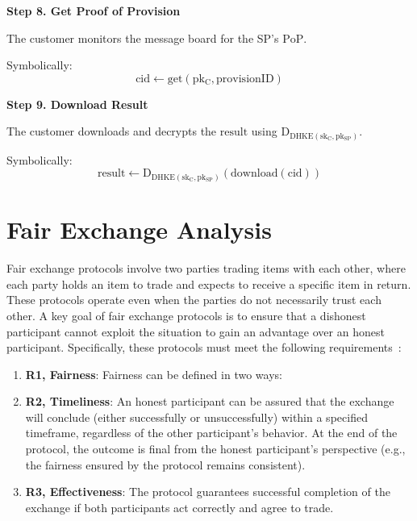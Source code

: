 \documentclass[pdftex,twocolumn,epjc3]{svjour3}
\begin{document}
\noindent \textbf{Step 8. Get Proof of Provision}\label{step-8-get-proof-of-provision}

The customer monitors the message board for the SP's $\mathrm{PoP}$.

Symbolically: 
\[
\mathrm{cid \gets get(pk_C, provisionID)}
\]

\noindent \textbf{Step 9. Download Result}\label{step-9-download-result}

The customer downloads and decrypts the $\mathrm{result}$ using $\mathrm{D_{DHKE(sk_C, pk_{SP})}}$.

Symbolically: 
\[
\mathrm{result \gets D_{DHKE(sk_C, pk_{SP})}(download(cid))}
\]

\section{Fair Exchange Analysis}\label{sec:fairness-analysis}

Fair exchange protocols involve two parties trading items with each other, where each party holds an item to trade and expects to receive a specific item in return. These protocols operate even when the parties do not necessarily trust each other. A key goal of fair exchange protocols is to ensure that a dishonest participant cannot exploit the situation to gain an advantage over an honest participant. Specifically, these protocols must meet the following requirements~\cite{asokanFairnessElectronicCommerce1998, liuFairnessCryptocurrencyPayments2018}:
\begin{enumerate}

    \item \textbf{R1, Fairness}: Fairness can be defined in two ways:

    \item \textbf{R2, Timeliness}: An honest participant can be assured that the exchange will conclude (either successfully or unsuccessfully) within a specified timeframe, regardless of the other participant's behavior. At the end of the protocol, the outcome is final from the honest participant's perspective (e.g., the fairness ensured by the protocol remains consistent).
    
    \item \textbf{R3, Effectiveness}: The protocol guarantees successful completion of the exchange if both participants act correctly and agree to trade.

\end{enumerate}    
\end{document}
